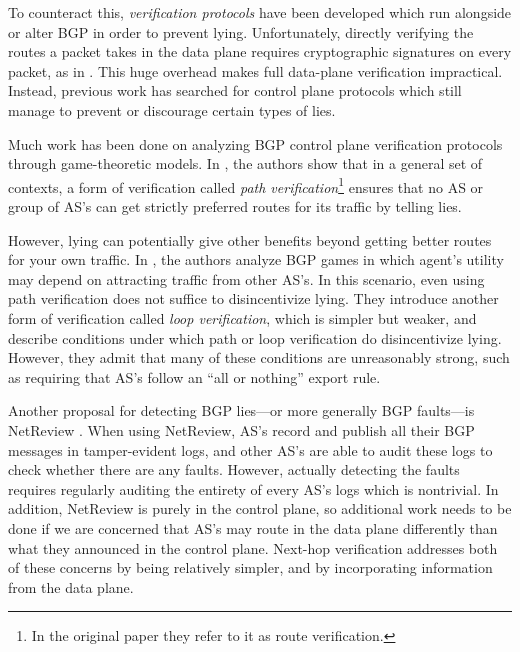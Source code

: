 \documentclass[pdftex,twoside,twocolumn,10pt,letterpaper]{article}
\begin{document}
    To counteract this, \emph{verification protocols} have been developed which
    run alongside or alter BGP in order to prevent lying.
    Unfortunately, directly verifying the routes a packet takes in the data plane
    requires cryptographic signatures on every packet, as in \cite{DataPlane}.
    This huge overhead makes full data-plane verification impractical.
    Instead, previous work has searched for control plane protocols
    which still manage to prevent or discourage certain types of lies.

    Much work has been done on analyzing BGP control plane
    verification protocols through game-theoretic models.
    In \cite{RoutingGames}, the authors show that in a general set of contexts, a form of
    verification called \emph{path verification}\footnote{
      In the original
      paper they refer to it as route verification.}
    ensures that no AS or group of
    AS's can get strictly preferred routes for its traffic by telling lies.

    However, lying can potentially give other benefits beyond getting better
    routes for your own traffic.
    In \cite{Attraction}, the authors analyze BGP games
    in which agent's utility may depend
    on attracting traffic from other AS's.
    In this scenario, even using path verification does not suffice to
    disincentivize lying.
    They introduce another form of verification
    called \emph{loop verification}, which is simpler but weaker, and describe
    conditions under which path or loop verification do disincentivize lying.
    However, they admit that many of these conditions are unreasonably strong,
    such as requiring that AS's follow an ``all or nothing'' export rule.

    Another proposal for detecting BGP lies---or more generally BGP faults---is
    NetReview \cite{NetReview}. When using NetReview, AS's record and publish
    all their BGP messages in tamper-evident logs, and other AS's are able to
    audit these logs to check whether there are any faults. However, actually
    detecting the faults requires regularly auditing the entirety of every AS's
    logs which is nontrivial. In addition, NetReview is purely in the control
    plane, so additional work needs to be done if we are concerned that AS's may
    route in the data plane differently than what they announced in the control
    plane. Next-hop verification addresses both of these concerns by being
    relatively simpler, and by incorporating information from the data plane.
\end{document}
